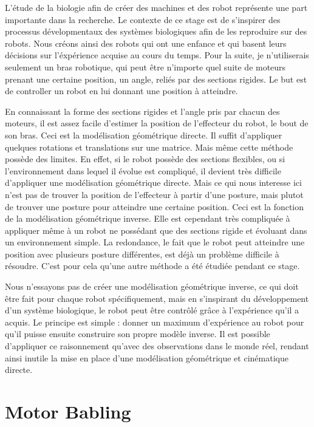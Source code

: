 \documentclass[11pt,french]{report}
\begin{document}
L'étude de la biologie afin de créer des machines et des robot représente une part importante dans la recherche. Le contexte de ce stage est de s'inspirer des processus dévelopmentaux des systèmes biologiques afin de les reproduire sur des robots. Nous créons ainsi des robots qui ont une enfance et qui basent leurs décisions sur l'éxpérience acquise au cours du temps. Pour la suite, je n'utiliserais seulement un bras robotique, qui peut être n'importe quel suite de moteurs prenant une certaine position, un angle, reliés par des sections rigides. Le but est de controller un robot en lui donnant une position à atteindre.

En connaissant la forme des sections rigides et l'angle pris par chacun des moteurs, il est assez facile d'estimer la position de l'effecteur du robot, le bout de son bras. Ceci est la modélisation géométrique directe. Il suffit d'appliquer quelques rotations et translations sur une matrice. Mais même cette méthode possède des limites. En effet, si le robot possède des sections flexibles, ou si l'environnement dans lequel il évolue est compliqué, il devient très difficile d'appliquer une modélisation géométrique directe. Mais ce qui nous interesse ici n'est pas de trouver la position de l'effecteur à partir d'une posture, mais plutot de trouver une posture pour atteindre une certaine position. Ceci est la fonction de la modélisation géométrique inverse. Elle est cependant très compliquée à appliquer même à un robot ne possédant que des sections rigide et évoluant dans un environnement simple. La redondance, le fait que le robot peut atteindre une position avec plusieurs posture différentes, est déjà un problème difficile à résoudre. C'est pour cela qu'une autre méthode a été étudiée pendant ce stage.

Nous n'essayons pas de créer une modélisation géométrique inverse, ce qui doit être fait pour chaque robot spécifiquement, mais en s'inspirant du développement d'un système biologique, le robot peut être contrôlé grâce à l'expérience qu'il a acquis. Le principe est simple : donner un maximum d'expérience au robot pour qu'il puisse ensuite construire son propre modèle inverse. Il est possible d'appliquer ce raisonnement qu'avec des observations dans le monde réel, rendant ainsi inutile la mise en place d'une modélisation géométrique et cinématique directe.

\section{Motor Babling}
\end{document}
